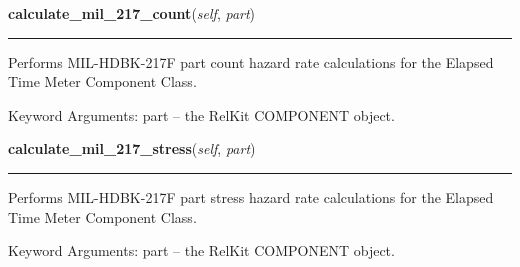     \label{reliafree:meters:meter:ElapsedTime:calculate_mil_217_count}

    \vspace{0.5ex}

\hspace{.8\funcindent}\begin{boxedminipage}{\funcwidth}

    \raggedright \textbf{calculate\_mil\_217\_count}(\textit{self}, \textit{part})

    \vspace{-1.5ex}

    \rule{\textwidth}{0.5\fboxrule}
\setlength{\parskip}{2ex}
    Performs MIL-HDBK-217F part count hazard rate calculations for the 
    Elapsed Time Meter Component Class.

    Keyword Arguments: part -- the RelKit COMPONENT object.

\setlength{\parskip}{1ex}
    \end{boxedminipage}

    \label{reliafree:meters:meter:ElapsedTime:calculate_mil_217_stress}

    \vspace{0.5ex}

\hspace{.8\funcindent}\begin{boxedminipage}{\funcwidth}

    \raggedright \textbf{calculate\_mil\_217\_stress}(\textit{self}, \textit{part})

    \vspace{-1.5ex}

    \rule{\textwidth}{0.5\fboxrule}
\setlength{\parskip}{2ex}
    Performs MIL-HDBK-217F part stress hazard rate calculations for the 
    Elapsed Time Meter Component Class.

    Keyword Arguments: part -- the RelKit COMPONENT object.

\setlength{\parskip}{1ex}
    \end{boxedminipage}

